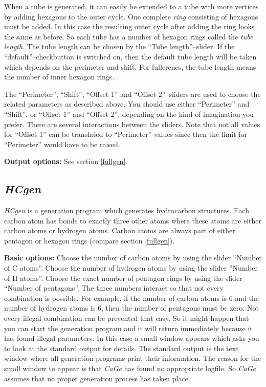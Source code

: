 \documentclass[a4paper]{article}
\def\CaGe{\textit{CaGe}}
\begin{document}
When a tube is generated, it can easily be extended to a tube with more
vertices by adding hexagons to the outer cycle. One complete \textit{ring}
consisting of hexagons must be added. In this case the resulting outer cycle
after adding the ring looks the same as before. So each tube has a number of
hexagon rings called the \textit{tube length}. The tube length can be 
chosen by the ``Tube length''--slider. If the ``default''--checkbutton is 
switched on, then the default tube length will be taken which depends on the
perimeter and shift. For fullerenes, the tube length means the number of
inner hexagon rings.

The ``Perimeter'', ``Shift'', ``Offset 1'' and ``Offset 2''--sliders are used
to choose the related parameters as described above. You should use either
``Perimeter'' and ``Shift'', or ``Offset 1'' and ``Offset 2'', depending on the
kind of imagination you prefer. There are several interactions between the
sliders. Note that not all values for ``Offset 1'' can be translated to
``Perimeter'' values since then the limit for ``Perimeter'' would have to be 
raised.
  
\noindent\textbf{Output options:} See section \ref{fullgen}.

\subsection{\textit{HCgen}}

\textit{HCgen} is a generation program which generates hydrocarbon structures.
Each carbon atom has bonds to exactly three other atoms where these atoms are
either carbon atoms or hydrogen atoms. Carbon atoms are always part of either
pentagon or hexagon rings (compare section \ref{fullgen}).

\noindent\textbf{Basic options:} 
Choose the number of carbon atoms by using the slider
``Number of C atoms''. Choose the number of hydrogen atoms by using the slider
''Number of H atoms''. Choose the exact number of pentagon rings by using the
slider ``Number of pentagons''. The three numbers interact so that not every
combination is possible. For example, if the number of carbon atoms is 6 and
the number of hydrogen atoms is 6, then the number of pentagons must be zero.
Not every illegal combination can be prevented that easy. So it might happen
that you can start the generation program and it will return immediately
because it has found illegal parameters. In this case a small window appears
which asks you to look at the standard output for details. The standard output
is the text window where all generation programs print their information.
The reason for the small window to appear is that \CaGe{}
has found no appropriate logfile. So \CaGe{} assumes that no proper generation
process has taken place. 
\end{document}

